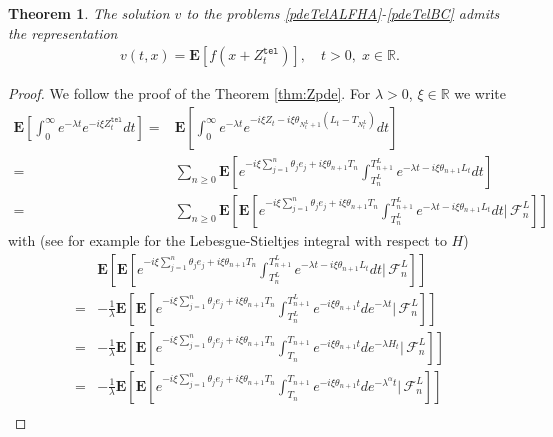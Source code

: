 \documentclass[10pt,a4paper]{article}
\numberwithin{equation}{section}
\theoremstyle{plain}
\newtheorem{theorem}{Theorem}
\theoremstyle{remark}
\begin{document}
\begin{theorem}
The solution $v$ to the problems \eqref{pdeTelALFHA}-\eqref{pdeTelBC} admits the representation
\begin{align*}
v(t,x) = \mathbf{E}[f(x + Z_t^\mathtt{tel})], \quad t >0,\; x \in \mathbb{R}.
\end{align*} 
\label{thm:Ztelpde}
\end{theorem}
\begin{proof}
We follow the proof of the Theorem \ref{thm:Zpde}. For $\lambda>0$, $\xi \in \mathbb{R}$ we write
\begin{align*}
\mathbf{E} \left[ \int_0^\infty e^{-\lambda t} e^{-i\xi Z^\mathtt{tel}_t} dt \right] 
= & \mathbf{E} \left[ \int_0^\infty e^{-\lambda t} e^{-i\xi Z_t - i \xi \theta_{N^L_t + 1} ( L_t - T_{N^L_t})} dt \right]\\
= & \sum_{n \geq 0} \mathbf{E} \left[  e^{-i\xi \sum_{j=1}^{n} \theta_j e_j + i \xi \theta_{n + 1} T_n} \int_{T^L_n}^{T^L_{n+1}} e^{ - \lambda t - i \xi \theta_{n + 1} L_t } dt \right]\\
= & \sum_{n \geq 0}  \mathbf{E} \left[  \mathbf{E} \left[  e^{-i\xi \sum_{j=1}^{n} \theta_j e_j + i \xi \theta_{n + 1} T_n}  \int_{T^L_n}^{T^L_{n+1}} e^{ - \lambda t - i \xi \theta_{n + 1} L_t } dt \bigg| \, \mathcal{F}^L_n \right] \right]
\end{align*}
with (see for example \cite{EJP} for the Lebesgue-Stieltjes integral with respect to $H$)
\begin{align*}
& \mathbf{E}\left[ \mathbf{E} \left[   e^{-i\xi \sum_{j=1}^{n} \theta_j e_j + i \xi \theta_{n + 1} T_n}\int_{T^L_n}^{T^L_{n+1}} e^{ - \lambda t - i \xi \theta_{n + 1} L_t } dt \bigg| \, \mathcal{F}^L_n \right] \right] \\
= & - \frac{1}{\lambda} \mathbf{E}\left[ \mathbf{E} \left[  e^{-i\xi \sum_{j=1}^{n} \theta_j e_j + i \xi \theta_{n + 1} T_n} \int_{T^L_n}^{T^L_{n+1}} e^{ - i \xi \theta_{n + 1} t } de^{-\lambda t} \bigg| \, \mathcal{F}^L_n \right] \right]\\
= & - \frac{1}{\lambda} \mathbf{E}\left[ \mathbf{E} \left[  e^{-i\xi \sum_{j=1}^{n} \theta_j e_j + i \xi \theta_{n + 1} T_n} \int_{T_n}^{T_{n+1}} e^{- i \xi \theta_{n + 1} t } de^{-\lambda H_t} \bigg| \, \mathcal{F}^L_n \right] \right]\\
= & - \frac{1}{\lambda} \mathbf{E}\left[ \mathbf{E} \left[  e^{-i\xi \sum_{j=1}^{n} \theta_j e_j + i \xi \theta_{n + 1} T_n} \int_{T_n}^{T_{n+1}} e^{- i \xi \theta_{n + 1} t } de^{-\lambda^\alpha t} \bigg| \, \mathcal{F}^L_n \right] \right]\\

\end{align*}
\end{proof}
\end{document}
